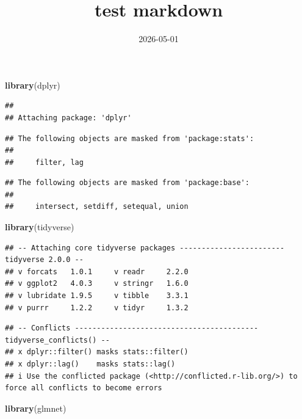 \documentclass[
]{article}
\title{test markdown}
\author{}
\date{\vspace{-2.5em}2026-05-01}
\newenvironment{Shaded}{\begin{snugshade}}{\end{snugshade}}
\newcommand{\FunctionTok}[1]{\textcolor[rgb]{0.13,0.29,0.53}{\textbf{#1}}}
\newcommand{\NormalTok}[1]{#1}
\begin{document}
\maketitle

\begin{Shaded}
\begin{Highlighting}[]
\FunctionTok{library}\NormalTok{(dplyr)}
\end{Highlighting}
\end{Shaded}

\begin{verbatim}
## 
## Attaching package: 'dplyr'
\end{verbatim}

\begin{verbatim}
## The following objects are masked from 'package:stats':
## 
##     filter, lag
\end{verbatim}

\begin{verbatim}
## The following objects are masked from 'package:base':
## 
##     intersect, setdiff, setequal, union
\end{verbatim}

\begin{Shaded}
\begin{Highlighting}[]
\FunctionTok{library}\NormalTok{(tidyverse)}
\end{Highlighting}
\end{Shaded}

\begin{verbatim}
## -- Attaching core tidyverse packages ------------------------ tidyverse 2.0.0 --
## v forcats   1.0.1     v readr     2.2.0
## v ggplot2   4.0.3     v stringr   1.6.0
## v lubridate 1.9.5     v tibble    3.3.1
## v purrr     1.2.2     v tidyr     1.3.2
\end{verbatim}

\begin{verbatim}
## -- Conflicts ------------------------------------------ tidyverse_conflicts() --
## x dplyr::filter() masks stats::filter()
## x dplyr::lag()    masks stats::lag()
## i Use the conflicted package (<http://conflicted.r-lib.org/>) to force all conflicts to become errors
\end{verbatim}

\begin{Shaded}
\begin{Highlighting}[]
\FunctionTok{library}\NormalTok{(glmnet)}
\end{Highlighting}
\end{Shaded}
\end{document}
